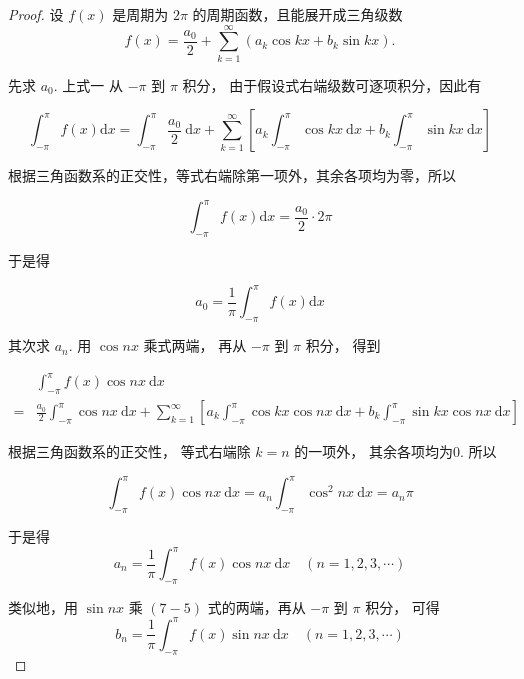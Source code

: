 \begin{proof}
    设 $ f(x) $ 是周期为 $ 2 \pi $ 的周期函数，且能展开成三角级数
\begin{equation}
f(x)=\frac{a_{0}}{2}+\sum_{k=1}^{\infty}\left(a_{k} \cos k x+b_{k} \sin k x\right) .
\end{equation}

先求 $ a_{0} $. 上式一 从 $ -\pi $ 到 $ \pi $ 积分， 由于假设式右端级数可逐项积分，因此有

\begin{equation} \int_{-\pi}^{\pi} f(x) \mathrm{d} x=\int_{-\pi}^{\pi} \frac{a_{0}}{2} \mathrm{~d} x+\sum_{k=1}^{\infty}\left[a_{k} \int_{-\pi}^{\pi} \cos k x \mathrm{~d} x+b_{k} \int_{-\pi}^{\pi} \sin k x \mathrm{~d} x\right] \end{equation}

根据三角函数系的正交性，等式右端除第一项外，其余各项均为零，所以

\begin{equation} \int_{-\pi}^{\pi} f(x) \mathrm{d} x=\frac{a_{0}}{2} \cdot 2 \pi \end{equation}

于是得

\begin{equation} a_{0}=\frac{1}{\pi} \int_{-\pi}^{\pi} f(x) \mathrm{d} x \end{equation}

其次求 $ a_{n} . $ 用 $ \cos n x $ 乘式两端， 再从 $ -\pi $ 到 $ \pi $ 积分， 得到

\begin{equation} \begin{aligned}  &\int_{-\pi}^{\pi} f(x) \cos n x \mathrm{~d} x\\ =&\frac{a_{0}}{2} \int_{-\pi}^{\pi} \cos n x \mathrm{~d} x+\sum_{k=1}^{\infty}\left[a_{k} \int_{-\pi}^{\pi} \cos k x \cos n x \mathrm{~d} x+b_{k} \int_{-\pi}^{\pi} \sin k x \cos n x \mathrm{~d} x\right] \end{aligned} \end{equation}

根据三角函数系的正交性， 等式右端除 $ k=n $ 的一项外， 其余各项均为0. 所以

\begin{equation} \int_{-\pi}^{\pi} f(x) \cos n x \mathrm{~d} x=a_{n} \int_{-\pi}^{\pi} \cos ^{2} n x \mathrm{~d} x=a_{n} \pi \end{equation}

于是得\begin{equation} a_{n}=\frac{1}{\pi} \int_{-\pi}^{\pi} f(x) \cos n x \mathrm{~d} x \quad(n=1,2,3, \cdots) \end{equation}

类似地，用 $ \sin n x $ 乘 $ (7-5) $ 式的两端，再从 $ -\pi $ 到 $ \pi $ 积分， 可得
\begin{equation}
b_{n}=\frac{1}{\pi} \int_{-\pi}^{\pi} f(x) \sin n x \mathrm{~d} x \quad(n=1,2,3, \cdots)
\end{equation}
\end{proof}


